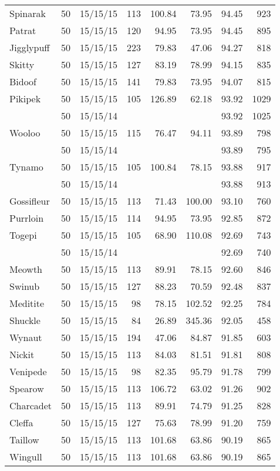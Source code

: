\begin{longtable}{lrrrrrrr}
Spinarak & 50 & 15/15/15 & 113 & 100.84 & 73.95 & 94.45 &  923\\
Patrat & 50 & 15/15/15 & 120 & 94.95 & 73.95 & 94.45 &  895\\
Jigglypuff & 50 & 15/15/15 & 223 & 79.83 & 47.06 & 94.27 &  818\\
Skitty & 50 & 15/15/15 & 127 & 83.19 & 78.99 & 94.15 &  835\\
Bidoof & 50 & 15/15/15 & 141 & 79.83 & 73.95 & 94.07 &  815\\
Pikipek & 50 & 15/15/15 & 105 & 126.89 & 62.18 & 93.92 & 1029\\
 & 50 & 15/15/14 & & & & 93.92 & 1025\\
Wooloo & 50 & 15/15/15 & 115 & 76.47 & 94.11 & 93.89 &  798\\
 & 50 & 15/15/14 & & & & 93.89 &  795\\
Tynamo & 50 & 15/15/15 & 105 & 100.84 & 78.15 & 93.88 &  917\\
 & 50 & 15/15/14 & & & & 93.88 &  913\\
Gossifleur & 50 & 15/15/15 & 113 & 71.43 & 100.00 & 93.10 &  760\\
Purrloin & 50 & 15/15/15 & 114 & 94.95 & 73.95 & 92.85 &  872\\
Togepi & 50 & 15/15/15 & 105 & 68.90 & 110.08 & 92.69 &  743\\
 & 50 & 15/15/14 & & & & 92.69 &  740\\
Meowth & 50 & 15/15/15 & 113 & 89.91 & 78.15 & 92.60 &  846\\
Swinub & 50 & 15/15/15 & 127 & 88.23 & 70.59 & 92.48 &  837\\
Meditite & 50 & 15/15/15 & 98 & 78.15 & 102.52 & 92.25 &  784\\
Shuckle & 50 & 15/15/15 & 84 & 26.89 & 345.36 & 92.05 &  458\\
Wynaut & 50 & 15/15/15 & 194 & 47.06 & 84.87 & 91.85 &  603\\
Nickit & 50 & 15/15/15 & 113 & 84.03 & 81.51 & 91.81 &  808\\
Venipede & 50 & 15/15/15 & 98 & 82.35 & 95.79 & 91.78 &  799\\
Spearow & 50 & 15/15/15 & 113 & 106.72 & 63.02 & 91.26 &  902\\
Charcadet & 50 & 15/15/15 & 113 & 89.91 & 74.79 & 91.25 &  828\\
Cleffa & 50 & 15/15/15 & 127 & 75.63 & 78.99 & 91.20 &  759\\
Taillow & 50 & 15/15/15 & 113 & 101.68 & 63.86 & 90.19 &  865\\
Wingull & 50 & 15/15/15 & 113 & 101.68 & 63.86 & 90.19 &  865\\

\end{longtable}
